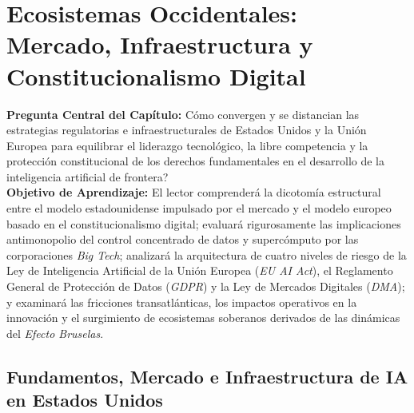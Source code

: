 \section[Ecosistemas Occidentales]{Ecosistemas Occidentales: Mercado, Infraestructura y Constitucionalismo Digital}

\begin{cajabeige}
\textbf{Pregunta Central del Capítulo:} \textquestiondown Cómo convergen y se distancian las estrategias regulatorias e infraestructurales de Estados Unidos y la Unión Europea para equilibrar el liderazgo tecnológico, la libre competencia y la protección constitucional de los derechos fundamentales en el desarrollo de la inteligencia artificial de frontera?\\[0.3cm]
\textbf{Objetivo de Aprendizaje:} El lector comprenderá la dicotomía estructural entre el modelo estadounidense impulsado por el mercado y el modelo europeo basado en el constitucionalismo digital; evaluará rigurosamente las implicaciones antimonopolio del control concentrado de datos y supercómputo por las corporaciones \textit{Big Tech}; analizará la arquitectura de cuatro niveles de riesgo de la Ley de Inteligencia Artificial de la Unión Europea (\textit{EU AI Act}), el Reglamento General de Protección de Datos (\textit{GDPR}) y la Ley de Mercados Digitales (\textit{DMA}); y examinará las fricciones transatlánticas, los impactos operativos en la innovación y el surgimiento de ecosistemas soberanos derivados de las dinámicas del \textit{Efecto Bruselas}.
\end{cajabeige}


\vspace{0.4cm}

\subsection{Fundamentos, Mercado e Infraestructura de IA en Estados Unidos}

